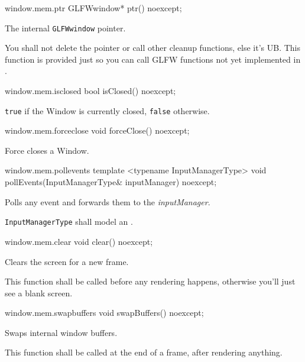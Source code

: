 
\begin{tewicode}{window.mem.ptr}
GLFWwindow* ptr() noexcept;
\end{tewicode}
\begin{itemdescr}
\pnum
\returns
The internal \texttt{GLFWwindow} pointer.

\pnum
\requires
You shall not delete the pointer or call other cleanup functions, else it's UB.
This function is provided just so you can call GLFW functions not yet implemented in \tewi.

\end{itemdescr}

\begin{tewicode}{window.mem.isclosed}
bool isClosed() noexcept;
\end{tewicode}
\begin{itemdescr}
\pnum
\returns
\texttt{true} if the Window is currently closed, \texttt{false} otherwise.
\end{itemdescr}

\begin{tewicode}{window.mem.forceclose}
void forceClose() noexcept;
\end{tewicode}
\begin{itemdescr}
\pnum
\effects Force closes a Window.
\end{itemdescr}

\begin{tewicode}{window.mem.pollevents}
template <typename InputManagerType>
void pollEvents(InputManagerType& inputManager) noexcept;
\end{tewicode}
\begin{itemdescr}
\pnum
\effects
Polls any event and forwards them to the \textit{inputManager}.

\pnum
\requires
\texttt{InputManagerType} shall model an .
\end{itemdescr}

\begin{tewicode}{window.mem.clear}
void clear() noexcept;
\end{tewicode}
\begin{itemdescr}
\pnum
\effects
Clears the screen for a new frame.

\pnum
\remarks
This function shall be called before any rendering happens, otherwise you'll
just see a blank screen.
\end{itemdescr}

\begin{tewicode}{window.mem.swapbuffers}
void swapBuffers() noexcept;
\end{tewicode}
\begin{itemdescr}
\pnum
\effects
Swaps internal window buffers.

\pnum
\remarks
This function shall be called at the end of a frame, after rendering anything.
\end{itemdescr}





